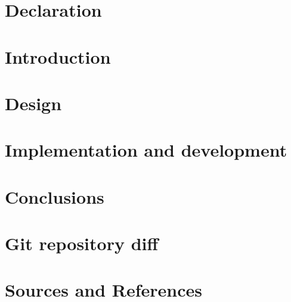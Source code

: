 \section*{Declaration}


\newpage

\section{Introduction}

\newpage

\section{Design}

\newpage

\section{Implementation and development}

\newpage

\section{Conclusions}

\newpage

\section{Git repository diff}

\newpage

\section*{Sources and References}
